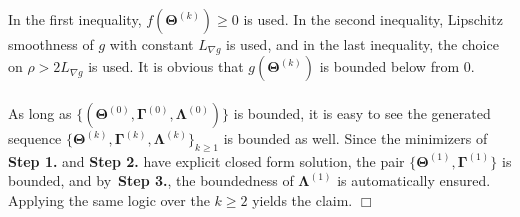 \documentclass[alpha-refs]{wiley-article}
\begin{document}
In the first inequality, $f(\boldsymbol{\Theta}^{(k)}) \geq 0$ is used.
In the second inequality, Lipschitz smoothness of $g$ with constant $L_{\nabla g}$ is used, and in the last inequality, the choice on $\rho>2L_{\nabla g}$ is used.
It is obvious that $g(\boldsymbol{\Theta}^{(k)})$ is bounded below from $0$.
\\ \\
As long as $\{(\boldsymbol{\Theta}^{(0)},\boldsymbol{\Gamma}^{(0)},\boldsymbol{\Lambda}^{(0)})\}$ is bounded, it is easy to see the generated sequence $\{\boldsymbol{\Theta}^{(k)},\boldsymbol{\Gamma}^{(k)},\boldsymbol{\Lambda}^{(k)}\}_{k \geq 1}$ is bounded as well.
Since the minimizers of \textbf{Step 1.} and \textbf{Step 2.} have explicit closed form solution, the pair $\{\boldsymbol{\Theta}^{(1)},\boldsymbol{\Gamma}^{(1)}\}$ is bounded, and by~\textbf{Step 3.}, the boundedness of $\boldsymbol{\Lambda}^{(1)}$ is automatically ensured.
Applying the same logic over the $k \geq 2$ yields the claim.
\qquad \qquad \qquad \qquad \qquad \qquad \qquad \qquad \qquad \qquad \qquad \qquad \qquad \qquad \qquad \qquad \qquad \qquad \qquad \qquad \qquad \qquad \qquad \quad $\Box$
\end{document}
